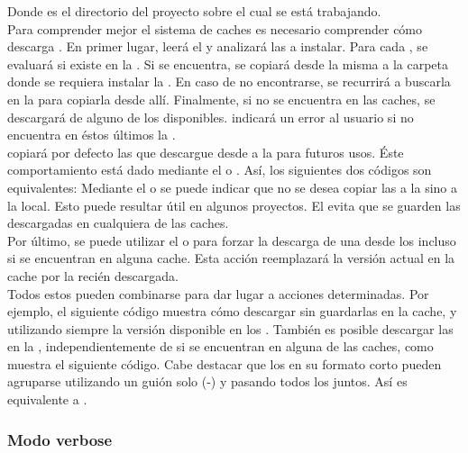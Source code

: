 Donde  es el directorio del proyecto sobre el cual 
se está trabajando.\\
Para comprender mejor el sistema de caches es necesario comprender cómo 
\fronttier descarga \dependencies. En primer lugar, \fronttier leerá el 
\conffile y analizará las \dependencies a instalar. Para cada \dependency, se 
evaluará si existe en la \cachel. Si se encuentra, se copiará desde la misma a 
la carpeta donde se requiera instalar la \dependency. En caso de no 
encontrarse, se recurrirá a buscarla en la \cacheg para copiarla desde allí. 
Finalmente, si no se encuentra en las caches, se descargará de alguno de los 
\onlinerepo disponibles. \fronttier indicará un error al usuario si no 
encuentra en éstos últimos la \dependency.\\
\fronttier copiará por defecto las \dependencies que descargue desde 
\onlinerepo a la \cacheg para futuros usos. Éste comportamiento está dado 
mediante el \flag {} o . Así, los siguientes dos 
códigos son equivalentes:
Mediante el \flag {} o  se puede indicar que no se 
desea copiar las \dependencies a la \cacheg sino a la local. Esto puede 
resultar útil en algunos proyectos. El \flag {} evita que se 
guarden las \dependencies descargadas en cualquiera de las caches.\\
Por último, se puede utilizar el \flag {} o  para 
forzar la descarga de una \dependency desde los \onlinerepo incluso si
se encuentran en alguna cache. Esta acción reemplazará la versión actual en
la cache por la recién descargada.\\
Todos estos \flags pueden combinarse para dar lugar a acciones determinadas. 
Por ejemplo, el siguiente código muestra cómo descargar \dependencies sin 
guardarlas en la cache, y utilizando siempre la versión disponible en los 
\onlinerepo.
También es posible descargar las \dependencies en la \cachel, 
independientemente de si se encuentran en alguna de las caches, como muestra el 
siguiente código.
Cabe destacar que los \flags en su formato corto pueden agruparse utilizando un
guión solo (-) y pasando todos los \flags juntos. Así  es 
equivalente a  .


\subsubsection{Modo verbose}
\label{subsubsec:guide:verbose}

